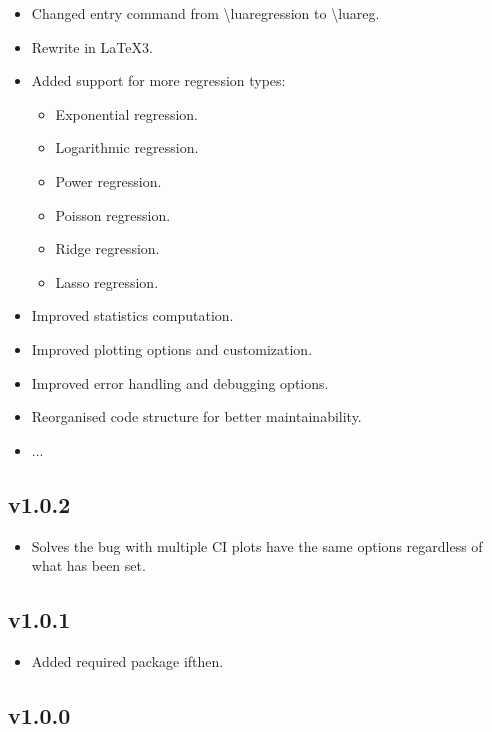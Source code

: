 \documentclass[11pt]{article}
\begin{document}
    \begin{itemize}
        \item Changed entry command from \textbackslash luaregression to \textbackslash luareg.
        \item Rewrite in \LaTeX 3.
        \item Added support for more regression types:
        \begin{itemize}
        	\item Exponential regression.
        	\item Logarithmic regression.
        	\item Power regression.
        	\item Poisson regression.
        	\item Ridge regression.
        	\item Lasso regression.
        \end{itemize}
        \item Improved statistics computation.
        \item Improved plotting options and customization.
        \item Improved error handling and debugging options.
        \item Reorganised code structure for better maintainability.
        \item ...
    \end{itemize}

    \subsection*{v1.0.2}

    \begin{itemize}
    	\item Solves the bug with multiple CI plots have the same options regardless of what has been set.
    \end{itemize}
    
    \subsection*{v1.0.1}
    
    \begin{itemize}
    	\item Added required package {\ttfamily ifthen}.
    \end{itemize}

    \subsection*{v1.0.0}
\end{document}
